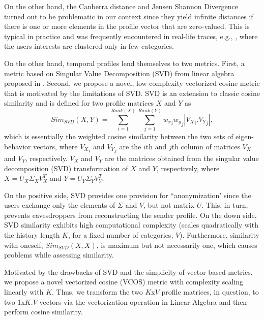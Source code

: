 \documentclass[12pt,epsf]{article}
\theoremstyle{definition}
\begin{document}
On the other hand, the Canberra distance and Jensen Shannon 
Divergence turned out to be problematic in our context since they 
yield infinite distances if there is 
one or more elements in the profile vector that are zero-valued. This is typical in practice 
and was frequently encountered in real-life traces, e.g., \cite{data}, 
where the users interests are clustered only in few categories.


On the other hand, temporal profiles lend themselves to two metrics. 
First, a metric based on Singular Value Decomposition (SVD) from linear 
algebra proposed in \cite{csi}. Second, we propose a novel, low-complexity vectorized 
cosine metric that is motivated by the limitations of SVD. 
SVD is an extension to classic cosine similarity and is defined for two profile
matrices $X$ and $Y$ as
\begin{equation}
\label{simEq}
Sim_{SVD}(X,Y)=\sum\limits_{i=1}^{Rank(X)} \sum\limits_{j=1}^{Rank(Y)} {w_x}_i {w_y}_j |{V_X}_i.{V_Y}_j|,
\end{equation}
which is essentially the weighted cosine similarity between the two sets of eigen-behavior vectors, where ${V_X}_i$ and ${V_Y}_j$ are the $i$th and $j$th column of matrices $V_X$ and $V_Y$, respectively. $V_X$ and $V_Y$ are the matrices obtained from the singular value decomposition (SVD) transformation \cite{svd} of $X$ and $Y$, respectively, where $X = U_X \Sigma_X V_X^T$ and $Y = U_Y \Sigma_Y V_Y^T$. 

On the positive side, SVD provides one provision for ``anonymization' since the users exchange only the elements of $\Sigma$ and $V$, but not matrix $U$. This, 
in turn, prevents eavesdroppers from reconstructing the sender profile.
On the down side, SVD similarity exhibits high computational complexity (scales 
quadratically with the history length $K$, for a fixed number of categories, $V$). 
Furthermore, similarity with oneself, $Sim_{SVD}(X,X)$, is maximum but not necessarily 
one, which causes problems while assessing similarity.

Motivated by the drawbacks of SVD and the simplicity of vector-based metrics, we 
propose a novel vectorized cosine (VCOS) metric with complexity scaling linearly with 
$K$. Thus, we transform the two $K$x$V$ profile matrices, in question, to two $1$x$K.V$ 
vectors via the vectorization operation in Linear Algebra \cite{svd} and then perform cosine similarity. 
%
\vspace{-0.3 cm}
\end{document}
